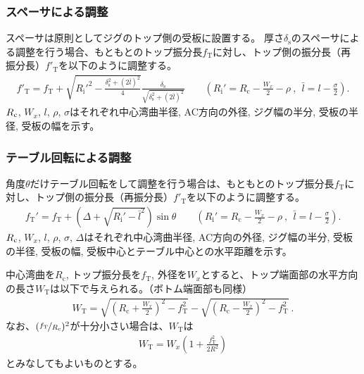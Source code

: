 \subsubsection{スペーサによる調整}
スペーサは原則としてジグのトップ側の受板に設置する。
厚さ$\delta_\mathrm s$のスペーサによる調整を行う場合、もともとのトップ振分長$f_\mathrm T$に対し、トップ側の振分長（再振分長）$f'_\mathrm T$を以下のように調整する。
\begin{align*}
  f'_\mathrm T
  = f_\mathrm T
    +\sqrt{R_\mathrm i'^2-\frac{\delta_\mathrm s^2+(2\bar l)^2}4}\frac{\delta_\mathrm s}{\sqrt{\delta_\mathrm s^2+(2\bar l)^2}}\qquad
    \left(R_\mathrm i' = R_\mathrm c-\frac{W_x}2-\rho~,~~\bar l = l-\frac\sigma2\right).
\end{align*}
$R_\textrm c$, $W_x$, $l$, $\rho$, $\sigma$はそれぞれ中心湾曲半径, AC方向の外径, ジグ幅の半分, 受板の半径, 受板の幅を示す。

\subsubsection{テーブル回転による調整}
角度$\theta$だけテーブル回転をして調整を行う場合は、もともとのトップ振分長$f_\mathrm T$に対し、トップ側の振分長（再振分長）$f'_\mathrm T$を以下のように調整する。
\begin{align*}
  f_\mathrm T'
  = f_\mathrm T+\left(\varDelta+\sqrt{R_\mathrm i'-\bar l^2}\right)\sin\theta\qquad
    \left(R_\mathrm i' = R_\mathrm c-\frac{W_x}2-\rho~,~~\bar l = l-\frac\sigma2\right).
\end{align*}
$R_\textrm c$, $W_x$, $l$, $\rho$, $\sigma$, $\varDelta$はそれぞれ中心湾曲半径, AC方向の外径, ジグ幅の半分, 受板の半径, 受板の幅, 受板中心とテーブル中心との水平距離を示す。


\clearpage
中心湾曲を$R_\mathrm c$, トップ振分長を$f_\mathrm T$, 外径を$W_x$とすると、トップ端面部の水平方向の長さ$W_\mathrm T$は以下で与えられる。（ボトム端面部も同様）
\begin{align*}
  W_\mathrm T
  = \sqrt{\left(R_\mathrm c+\frac{W_x}2\right)^{\!2}-f_\mathrm T^2}
    -\sqrt{\left(R_\mathrm c-\frac{W_x}2\right)^{\!2}-f_\mathrm T^2}\ .
\end{align*}
なお、$(\nicefrac{f_\mathrm T}{R_\mathrm c})^2$が十分小さい場合は、$W_\mathrm T$は
\begin{align*}
  W_\mathrm T
  = W_x\!\left(1+\frac{f_\mathrm T^2}{2R^2}\right)
\end{align*}
とみなしてもよいものとする。


